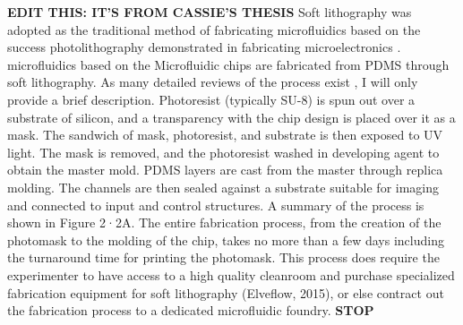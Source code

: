 \textbf{EDIT THIS: IT'S FROM CASSIE'S THESIS}
Soft lithography was adopted as the traditional method of fabricating microfluidics based on the success photolithography demonstrated in fabricating microelectronics \cite{whitesides2006}. microfluidics based on the Microfluidic chips are fabricated from PDMS through soft lithography. As many detailed reviews of the process exist \cite{duffy1998}\cite{sia2003}\cite{weibel2007}, I will only provide a brief description. Photoresist (typically SU-8) is spun out over a substrate of silicon, and a transparency with the chip design is placed over it as a mask. The sandwich of mask, photoresist, and substrate is then exposed to UV light. The mask is removed, and the photoresist washed in developing agent to obtain the master mold. PDMS layers are cast from the master through replica molding. The channels are then sealed against a substrate suitable for imaging and connected to input and control structures. A summary of the process is shown in Figure 2·2A. The entire fabrication process, from the creation of the photomask to the molding of the chip, takes no more than a few days including the turnaround time for printing the photomask. This process does require the experimenter to have access to a high quality cleanroom and purchase specialized fabrication equipment for soft lithography (Elveflow, 2015), or else contract out the fabrication process to a dedicated microfluidic foundry.
\textbf{STOP}

